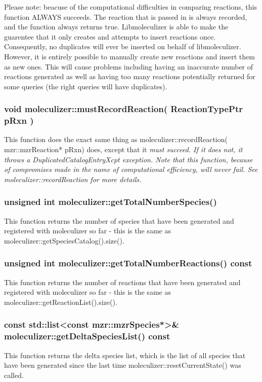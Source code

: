 Please note: beacuse of the computational difficulties in comparing
reactions, this function ALWAYS succeeds.  The reaction that is passed
in is always recorded, and the function always returns true.
Libmoleculizer is able to make the guarentee that it only creates and
attempts to insert reactions once.  Consequently, no duplicates will
ever be inserted on behalf of libmoleculizer.  However, it is entirely
possible to manually create new reactions and insert them as new
ones.  This will cause problems including having an inaccurate number
of reactions generated as well as having too many reactions
potentially returned for some queries (the right queries will have duplicates).

\subsubsection{void moleculizer::mustRecordReaction( ReactionTypePtr
  pRxn )}
This function does the exact same thing as
moleculizer::recordReaction( mzr::mzrReaction* pRxn) does, except that
it \em{must} succeed.  If it does not, it throws a
DuplicatedCatalogEntryXcpt exception.  Note that this function,
because of compromises made in the name of computational efficiency,
will never fail.  See moleculizer::recordReaction for more details.  

\subsubsection{unsigned int moleculizer::getTotalNumberSpecies()}
This function returns the number of species that have been generated
and registered with moleculizer so far - this is the same as
moleculizer::getSpeciesCatalog().size().

\subsubsection{unsigned int moleculizer::getTotalNumberReactions()
  const}
This function returns the number of reactions that have been generated
and registered with moleculizer so far - this is the same as
moleculizer::getReactionList().size(). 

\subsubsection{const std::list<const mzr::mzrSpecies*>\&
  moleculizer::getDeltaSpeciesList() const}
This function returns the delta species list, which is the list of all
species that have been generated since the last time
moleculizer::resetCurrentState() was called.  

